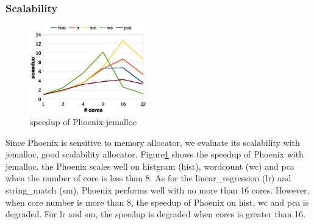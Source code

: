 \subsubsection{Scalability}
\begin{figure}[!h!t]  
	\centering
	\includegraphics[width=0.45\textwidth]{eps/phoenix_speedup_jemalloc.eps}
	\caption{speedup of Phoenix-jemalloc}
	\label{fig:phoenix:speedup:jemalloc}
\end{figure}



Since Phoenix is sensitive to memory allocator, we evaluate its scalability with jemalloc, good scalability allocator.
Figure\ref{fig:phoenix:speedup:jemalloc} shows the speedup of Phoenix with jemalloc.
the Phoenix scales well on histgram (hist), wordcount (wc) and pca when the number of core is less than 8.
As for the linear\_regression (lr) and string\_match (sm), 
Phoenix performs well with no more than 16 cores.
However, when core number is more than  8, 
the speedup of Phoenix  on hist,  wc and pca is degraded.
For lr and sm, the speedup is degraded when cores is greater than 16.

